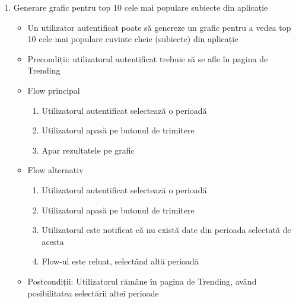 \begin{enumerate}
    \item Generare grafic pentru top 10 cele mai populare subiecte din aplicație
    \begin{itemize}
        \setlength\itemsep{0.5em}
        \item Un utilizator autentificat poate să genereze un grafic pentru a vedea top 10 cele mai populare cuvinte cheie (subiecte) din aplicație
        \item Precondiții: utilizatorul autentificat trebuie să se afle în pagina de Trending
        \item Flow principal
        \begin{enumerate}
            \setlength\itemsep{0.5em}
            \item Utilizatorul autentificat selectează o perioadă
            \item Utilizatorul apasă pe butonul de trimitere
            \item Apar rezultatele pe grafic
        \end{enumerate}
        \item Flow alternativ
        \begin{enumerate}
            \setlength\itemsep{0.5em}
            \item Utilizatorul autentificat selectează o perioadă
            \item Utilizatorul apasă pe butonul de trimitere
            \item Utilizatorul este notificat că nu există date din perioada selectată de acesta
            \item Flow-ul este reluat, selectând altă perioadă
        \end{enumerate}
        \item Postcondiții: Utilizatorul rămâne în pagina de Trending, având posibilitatea selectării altei perioade
    \end{itemize}


\end{enumerate}
